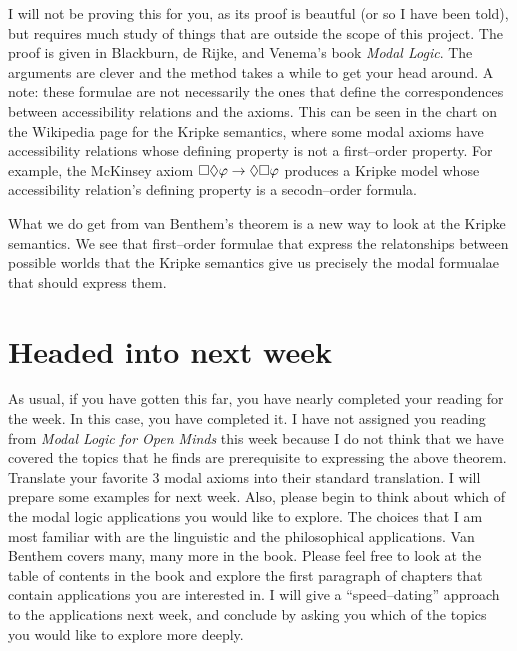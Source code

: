 \bigskip

\noindent{}
\bigskip

I will not be proving this for you, as its proof is beautful (or so I have been told), but requires much study of things that
are outside the scope of this project. The proof is given in Blackburn, de Rijke, and Venema's book \emph{Modal Logic}. The
arguments are clever and the method takes a while to get your head around. A note: these formulae are not necessarily the
ones that define the correspondences between accessibility relations and the axioms. This can be seen in the chart
on the Wikipedia page for the Kripke semantics, where some modal axioms have accessibility relations whose defining property
is not a first--order property. For example, the McKinsey axiom $\square \lozenge \varphi \rightarrow \lozenge \square \varphi$
produces a Kripke model whose accessibility relation's defining property is a secodn--order formula.

What we do get from van Benthem's theorem is a new way to look at the Kripke semantics. We see that first--order formulae that
express the relatonships between possible worlds that the Kripke semantics give us precisely the modal formualae that 
should express them.

\section{Headed into next week}
As usual, if you have gotten this far, you have nearly completed your reading for the week.
In this case, you have completed it. I have not assigned you reading from \emph{Modal Logic for Open Minds} this week
because I do not think that we have covered the topics that he finds are prerequisite to expressing the above theorem.
Translate your favorite 3 modal axioms into their standard translation. I will prepare some examples for next week.
Also, please begin to think about which of the modal logic applications you would like to explore. The choices that I am most
familiar with are the linguistic and the philosophical applications. Van Benthem covers many, many more in the book. Please
feel free to look at the table of contents in the book and explore the first paragraph of chapters that contain applications
you are interested in. I will give a ``speed--dating'' approach to the applications next week, and conclude by asking you
which of the topics you would like to explore more deeply. 
